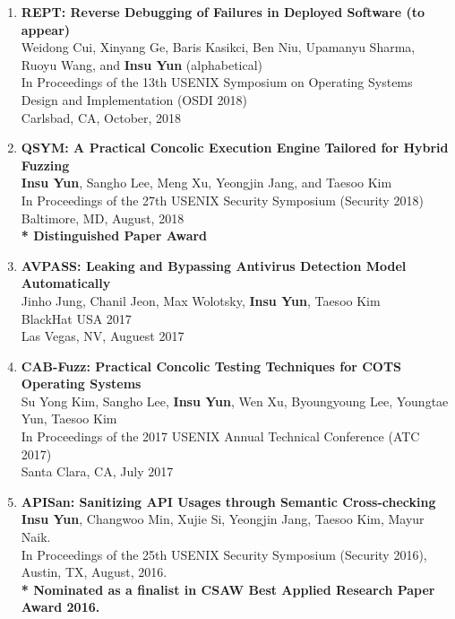 \documentclass[11pt,letterpaper]{article}
\begin{document}
\begin{enumerate}
  \item \textbf{REPT: Reverse Debugging of Failures in Deployed Software (to appear)} \\
  {\footnotesize
    Weidong Cui, Xinyang Ge, Baris Kasikci, Ben Niu, Upamanyu Sharma, Ruoyu Wang, and \textbf{Insu Yun} (alphabetical) \\
    In Proceedings of the 13th USENIX Symposium on Operating Systems Design and Implementation (OSDI 2018) \\
    Carlsbad, CA, October, 2018
  }
  \item \textbf{QSYM: A Practical Concolic Execution Engine Tailored for Hybrid Fuzzing} \\
  {\footnotesize
    \textbf{Insu Yun}, Sangho Lee, Meng Xu, Yeongjin Jang, and Taesoo Kim \\
    In Proceedings of the 27th USENIX Security Symposium (Security 2018) \\
    Baltimore, MD, August, 2018 \\
    \textbf{* Distinguished Paper Award}
  }
  \item \textbf{AVPASS: Leaking and Bypassing Antivirus Detection Model Automatically} \\
  {\footnotesize
    Jinho Jung, Chanil Jeon, Max Wolotsky, \textbf{Insu Yun}, Taesoo Kim \\
    BlackHat USA 2017 \\
    Las Vegas, NV, Auguest 2017
  }
  \item \textbf{CAB-Fuzz: Practical Concolic Testing Techniques for COTS Operating Systems} \\
  {\footnotesize
    Su Yong Kim, Sangho Lee, \textbf{Insu Yun}, Wen Xu, Byoungyoung Lee, Youngtae Yun, Taesoo Kim \\
    In Proceedings of the 2017 USENIX Annual Technical Conference (ATC 2017) \\
    Santa Clara, CA, July 2017 
  }
  \item \textbf{APISan: Sanitizing API Usages through Semantic Cross-checking} \\
  {\footnotesize
     \textbf{Insu Yun}, Changwoo Min, Xujie Si, Yeongjin Jang, Taesoo Kim, Mayur Naik. \\
     In Proceedings of the 25th USENIX Security Symposium (Security 2016), \\
     Austin, TX, August, 2016. \\
     \textbf{* Nominated as a finalist in CSAW Best Applied Research Paper Award 2016.}
}
\end{enumerate}
\end{document}
